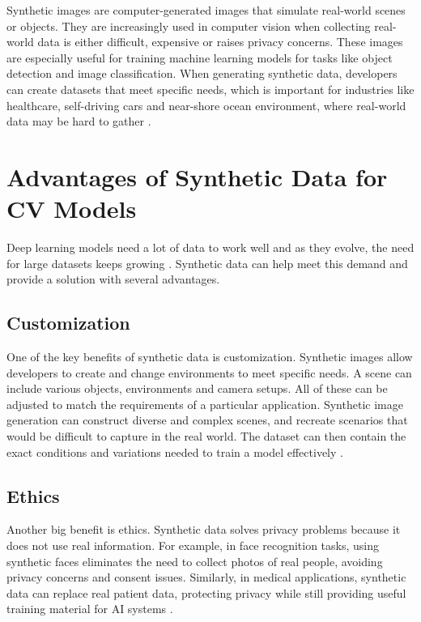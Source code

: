 Synthetic images are computer-generated images that simulate real-world scenes or objects. They are increasingly used in computer vision when collecting real-world data is either difficult, expensive or raises privacy concerns. These images are especially useful for training machine learning models for tasks like object detection and image classification. When generating synthetic data, developers can create datasets that meet specific needs, which is important for industries like healthcare, self-driving cars and near-shore ocean environment, where real-world data may be hard to gather \cite{jimaging8110310, safety}.

\section{Advantages of Synthetic Data for CV Models}

Deep learning models need a lot of data to work well and as they evolve, the need for large datasets keeps growing \cite{10.1145/3042064, nikolenko2021synthetic}. Synthetic data can help meet this demand and provide a solution with several advantages.
 
\subsection{Customization}
One of the key benefits of synthetic data is customization. Synthetic images allow developers to create and change environments to meet specific needs. A scene can include various objects, environments and camera setups. All of these can be adjusted to match the requirements of a particular application. Synthetic image generation can construct diverse and complex scenes, and recreate scenarios that would be difficult to capture in the real world. The dataset can then contain the exact conditions and variations needed to train a model effectively \cite{jimaging8110310, rajpura2017objectdetectionusingdeep}.

\subsection{Ethics}
Another big benefit is ethics. Synthetic data solves privacy problems because it does not use real information. For example, in face recognition tasks, using synthetic faces eliminates the need to collect photos of real people, avoiding privacy concerns and consent issues. Similarly, in medical applications, synthetic data can replace real patient data, protecting privacy while still providing useful training material for AI systems \cite{jimaging8110310}.

